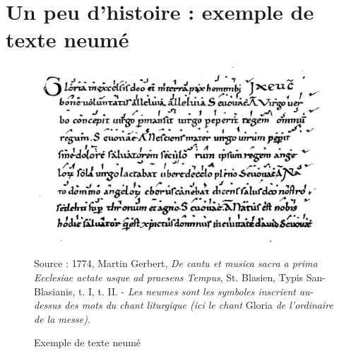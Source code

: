
\section{Un peu d'histoire : exemple de texte neumé}
\label{sec:exempleTexteNeume}
\begin{figure}[!htbp]
	\centering
	\includegraphics[keepaspectratio=true, width=\textwidth]{Annexes/i/neumes.jpg}
	\caption{Exemple de texte neumé  }
	\medskip
	\small	
	Source : 1774, Martin Gerbert, \textit{De cantu et musica sacra a prima Ecclesiae aetate usque ad praesens Tempus}, St. Blasien, Typis San-Blasianis, t. I, t. II. - \textit{Les neumes sont les symboles inscrient au-dessus des mots du chant liturgique (ici le chant} Gloria \textit{de l'ordinaire de la messe).}
	\label{fig:neumes}
\end{figure}
\clearpage

